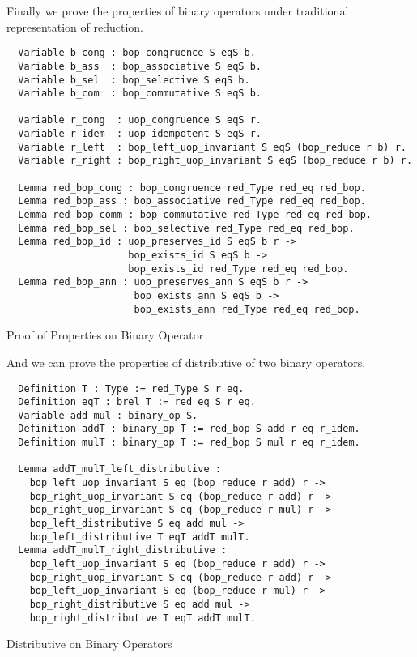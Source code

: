Finally we prove the properties of binary operators under traditional representation of reduction.
\begin{listing}[H]
\begin{verbatim}
  Variable b_cong : bop_congruence S eqS b. 
  Variable b_ass  : bop_associative S eqS b. 
  Variable b_sel  : bop_selective S eqS b. 
  Variable b_com  : bop_commutative S eqS b. 
  
  Variable r_cong  : uop_congruence S eqS r. 
  Variable r_idem  : uop_idempotent S eqS r. 
  Variable r_left  : bop_left_uop_invariant S eqS (bop_reduce r b) r.  
  Variable r_right : bop_right_uop_invariant S eqS (bop_reduce r b) r.
  
  Lemma red_bop_cong : bop_congruence red_Type red_eq red_bop.
  Lemma red_bop_ass : bop_associative red_Type red_eq red_bop. 
  Lemma red_bop_comm : bop_commutative red_Type red_eq red_bop. 
  Lemma red_bop_sel : bop_selective red_Type red_eq red_bop. 
  Lemma red_bop_id : uop_preserves_id S eqS b r -> 
                     bop_exists_id S eqS b -> 
                     bop_exists_id red_Type red_eq red_bop. 
  Lemma red_bop_ann : uop_preserves_ann S eqS b r -> 
                      bop_exists_ann S eqS b -> 
                      bop_exists_ann red_Type red_eq red_bop. 

\end{verbatim}
\caption{Proof of Properties on Binary Operator} 
\label{coq:proof:tr_bop}
\end{listing}

And we can prove the properties of distributive of two binary operators.
\begin{listing}[H]
\begin{verbatim}
  Definition T : Type := red_Type S r eq.
  Definition eqT : brel T := red_eq S r eq.
  Variable add mul : binary_op S.
  Definition addT : binary_op T := red_bop S add r eq r_idem. 
  Definition mulT : binary_op T := red_bop S mul r eq r_idem.
  
  Lemma addT_mulT_left_distributive :
    bop_left_uop_invariant S eq (bop_reduce r add) r ->
    bop_right_uop_invariant S eq (bop_reduce r add) r ->
    bop_right_uop_invariant S eq (bop_reduce r mul) r ->    
    bop_left_distributive S eq add mul -> 
    bop_left_distributive T eqT addT mulT.
  Lemma addT_mulT_right_distributive :
    bop_left_uop_invariant S eq (bop_reduce r add) r ->
    bop_right_uop_invariant S eq (bop_reduce r add) r ->
    bop_left_uop_invariant S eq (bop_reduce r mul) r ->    
    bop_right_distributive S eq add mul -> 
    bop_right_distributive T eqT addT mulT.
\end{verbatim}
\caption{Distributive on Binary Operators} 
\label{coq:proof:tr_distributive}
\end{listing}

